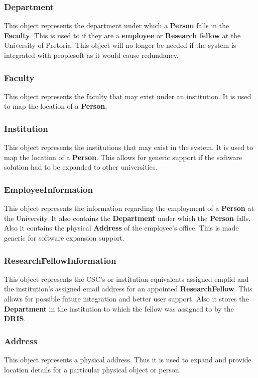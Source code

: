 \documentclass[12pt]{article}
\begin{document}
\subsubsection{Department}
This object represents the department under which a \textbf{Person} falls in the \textbf{Faculty}. This is used to if they are a \textbf{employee} or \textbf{Research fellow} at the University of Pretoria. This object will no longer be needed if the system is integrated with peoplesoft as it would cause redundancy.

\subsubsection{Faculty}
This object represents the faculty that may exist under an institution. It is used to map the location of a \textbf{Person}. 

\subsubsection{Institution}
This object represents the institutions that may exist in the system. It is used to map the location of a \textbf{Person}. This allows for generic support if the software solution had to be expanded to other universities.

\subsubsection{EmployeeInformation}
This object represents the information regarding the employment of a \textbf{Person} at the University. It also contains the \textbf{Department} under which the \textbf{Person} falls. Also it contains the physical \textbf{Address} of the employee's office. This is made generic for software expansion support.  

\subsubsection{ResearchFellowInformation}
This object represents the CSC's or institution equivalents assigned emplid and the institution's assigned email address for an appointed \textbf{ResearchFellow}. This allows for possible future integration and better user support. Also it stores the \textbf{Department} in the institution to which the fellow was assigned to by the \textbf{DRIS}.

\subsubsection{Address}
This object represents a physical address. Thus it is used to expand and provide location details for a particular physical object or person.  
\end{document}
